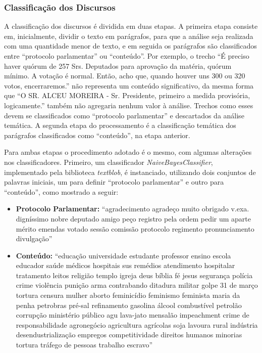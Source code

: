 \subsubsection{Classificação dos Discursos}

A classificação dos discursos é dividida em duas etapas. A primeira etapa consiste em, inicialmente, dividir o texto em parágrafos, para que a análise seja realizada com uma quantidade menor de texto, e em seguida os parágrafos são classificados entre ``protocolo parlamentar'' ou ``conteúdo''. Por exemplo, o trecho ``É preciso haver quórum de 257 Srs. Deputados para aprovação da matéria, quórum mínimo. A votação é normal. Então, acho que, quando houver uns 300 ou 320 votos, encerraremos.'' não representa um conteúdo significativo, da mesma forma que ``O SR. ALCEU MOREIRA - Sr. Presidente, primeiro a medida provisória, logicamente.'' também não agregaria nenhum valor à análise. Trechos como esses devem se classificados como ``protocolo parlamentar'' e descartados da análise temática. A segunda etapa do processamento é a classificação temática dos parágrafos classificados como ``conteúdo'', na etapa anterior.

Para ambas etapas o procedimento adotado é o mesmo, com algumas alterações nos classificadores. Primeiro, um classificador \textit{NaiveBayesClassifier}, implementado pela biblioteca \textit{textblob}, é instanciado, utilizando dois conjuntos de palavras iniciais, um para definir ``protocolo parlamentar'' e outro para ``conteúdo'', como mostrado a seguir:

\begin{itemize}
    \item \textbf{Protocolo Parlamentar:} ``agradecimento agradeço muito obrigado v.exa. digníssimo nobre deputado amigo peço registro pela ordem pedir um aparte mérito emendas votado sessão comissão protocolo regimento pronunciamento divulgação''
    \item \textbf{Conteúdo:} ``educação universidade estudante professor ensino escola educador saúde médicos hospitais sus remédios atendimento hospitalar tratamento leitos religião templo igreja deus bíblia fé jesus segurança polícia crime violência punição arma contrabando ditadura militar golpe 31 de março tortura censura mulher aborto feminicídio feminismo feminista maria da penha petrobras pré-sal refinamento gasolina álcool combustível petrolão corrupção ministério público agu lava-jato mensalão impeachment crime de responsabilidade agronegócio agricultura agrícolas soja lavoura rural indústria desendustrialização empregos competitividade direitos humanos minorias tortura tráfego de pessoas trabalho escravo''
\end{itemize}

